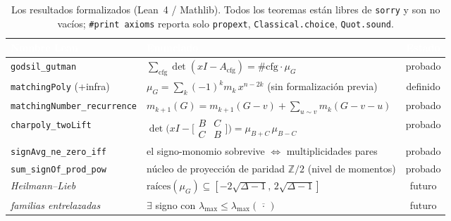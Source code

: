 
\begin{table}[t]
  \centering
  \small
  \caption{Los resultados formalizados (Lean~4 / Mathlib). Todos los teoremas
  están libres de \texttt{sorry} y son no vacíos; \texttt{\#print axioms} reporta
  solo \texttt{propext}, \texttt{Classical.choice}, \texttt{Quot.sound}.}
  \label{tab:results}
  \begin{tabular}{@{}llc@{}}
    \toprule
    \rowcolor{ggteal}
    \textcolor{white}{\textbf{Nombre Lean}} & \textcolor{white}{\textbf{Enunciado}} & \textcolor{white}{\textbf{Estado}} \\
    \midrule
    \rowcolor{ggband}
    \texttt{godsil\_gutman} & $\sum_{\mathrm{cfg}}\det(xI-A_{\mathrm{cfg}})=\#\mathrm{cfg}\cdot\mu_G$ & probado \\
    \texttt{matchingPoly} (+infra) & $\mu_G=\sum_k(-1)^k m_k\,x^{n-2k}$ (sin formalización previa) & definido \\
    \rowcolor{ggband}
    \texttt{matchingNumber\_recurrence} & $m_{k+1}(G)=m_{k+1}(G{-}v)+\sum_{u\sim v} m_k(G{-}v{-}u)$ & probado \\
    \texttt{charpoly\_twoLift} & $\det\!\bigl(xI-\bigl[\begin{smallmatrix}B&C\\C&B\end{smallmatrix}\bigr]\bigr)=\mu_{B+C}\,\mu_{B-C}$ & probado \\
    \rowcolor{ggband}
    \texttt{signAvg\_ne\_zero\_iff} & el signo-monomio sobrevive $\iff$ multiplicidades pares & probado \\
    \texttt{sum\_signOf\_prod\_pow} & núcleo de proyección de paridad $\mathbb{Z}/2$ (nivel de momentos) & probado \\
    \midrule
    \emph{Heilmann--Lieb} & $\text{raíces}(\mu_G)\subseteq[-2\sqrt{\Delta-1},\,2\sqrt{\Delta-1}]$ & futuro \\
    \rowcolor{ggband}
    \emph{familias entrelazadas} & $\exists$ signo con $\lambda_{\max}\le\lambda_{\max}(\overline{\,\cdot\,})$ & futuro \\
    \bottomrule
  \end{tabular}
\end{table}

